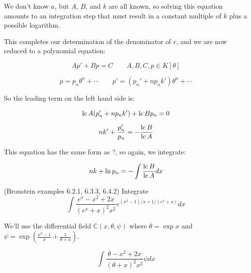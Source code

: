 We don't know $a$, but $A$, $B$, and $k$ are all known, so solving
this equation amounts to an integration step that must result in a
constant multiple of $k$ plus a possible logarithm.

This completes our determination of the denominator of $r$, and we
are now reduced to a polynomial equation:

$$A p' + B p = C \qquad A,B,C,p \in K[\theta]$$

$$p = p_n \theta^n + \cdots \qquad p' = (p_n' + n p_n k') \theta^n + \cdots$$

So the leading term on the left hand side is:

$${\rm lc\,} A (p_n' + n p_n k') + {\rm lc\,} B p_n = 0$$

$$n k' + \frac{p_n'}{p_n} = - \frac{{\rm lc\,} B}{{\rm lc\,} A}$$

This equation has the same form as ?, so again, we integrate:

$$n k + \ln p_n = - \int \frac{{\rm lc\,} B}{{\rm lc\,} A} dx$$

\vfill\eject

\example (Bronstein examples 6.2.1, 6.3.3, 6.4.2) Integrate
$$\int \frac{e^x - x^2 + 2x}{(e^x + x)^2 x^2}e^{(x^2-1)/x+1/(e^x+x)} dx$$

We'll use the differential field ${\mathbb C}(x, \theta, \psi)$ where
$\theta = \exp x$ and $\psi = \exp\left( \frac{x^2-1}{x}+\frac{1}{\theta+x}\right)$.

$$\int \frac{\theta - x^2 + 2x}{(\theta + x)^2 x^2} \psi dx$$


